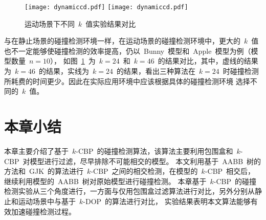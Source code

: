 \begin{figure}[H] 
\centering
{}
{  
   \texttt{[image: dynamiccd.pdf]}
}
{  
    \texttt{[image: dynamiccd.pdf]}
}
\caption{运动场景下不同~$k$~值实验结果对比}
\label{fig:chart:exp:kdop:kcbp:k24:k46:dynamic}
\end{figure}

与在静止场景的碰撞检测环境一样，在运动场景的碰撞检测环境中，更大的~$k$~值也不一定能够使碰撞检测的效率提高，仍以~Bunny~模型和~Apple~模型为例（模型数量~$n=10$），
如图~\ref{fig:chart:exp:kdop:kcbp:k24:k46:dynamic}~为~$k=24$~和~$k=46$~的结果对比，其中，虚线的结果为~$k=46$~的结果，实线为~$k=24$~的结果，看出三种算法在~$k=24$~时碰撞检测所耗费的时间更少。因此在实际应用环境中应该根据具体的碰撞检测环境
选择不同的~$k$~值。

\FloatBarrier
\section{本章小结}
\label{sec:chap03:summary}

本章主要介绍了基于~$k$-CBP~的碰撞检测算法，该算法主要利用包围盒和~$k$-CBP~对模型进行过滤，尽早排除不可能相交的模型。
本文利用基于~AABB~树的方法和~GJK~的算法进行~$k$-CBP~之间的相交检测，在模型的~$k$-CBP~相交后，继续利用模型的~AABB~树对原始模型进行碰撞检测。
本章基于~$k$-CBP~的碰撞检测实验从三个角度进行，一方面与仅用包围盒过滤算法进行对比，另外分别从静止和运动场景中与基于~$k$-DOP~的算法进行对比，
实验结果表明本文算法能够有效加速碰撞检测过程。

